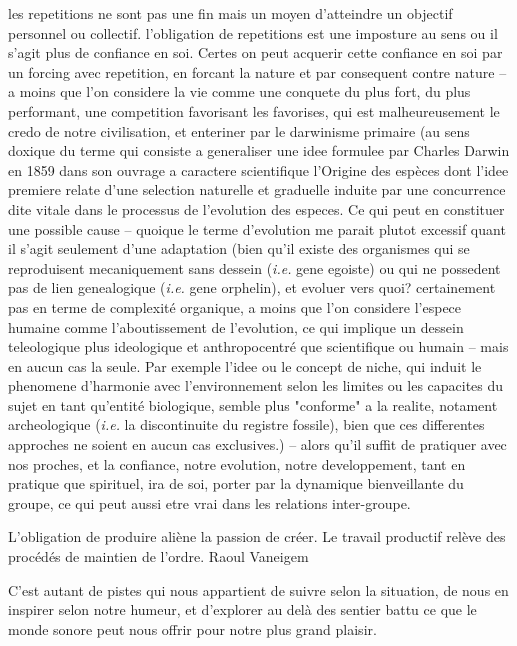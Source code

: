 \documentclass{article}
\begin{document}
les repetitions ne sont pas une fin mais un moyen d'atteindre un objectif personnel ou collectif.
l'obligation de repetitions est une imposture au sens ou il s'agit plus de confiance en soi. Certes on peut acquerir cette confiance en soi par un forcing avec repetition, en forcant la nature et par consequent contre nature -- a moins que l'on considere la vie comme une conquete du plus fort, du plus performant, une competition favorisant les favorises, qui est malheureusement le credo de notre civilisation, et enteriner par le darwinisme primaire (au sens doxique du terme qui consiste a generaliser une idee formulee par Charles Darwin en 1859 dans son ouvrage a caractere scientifique l'Origine des espèces dont l'idee premiere relate d'une selection naturelle et graduelle induite par une concurrence dite vitale dans le processus de l'evolution des especes. Ce qui peut en constituer une possible cause -- quoique le terme d'evolution me parait plutot excessif quant il s'agit seulement d'une adaptation (bien qu'il existe des organismes qui se reproduisent mecaniquement sans dessein (\textit{i.e.} gene egoiste) ou qui ne possedent pas de lien genealogique (\textit{i.e.} gene orphelin), et evoluer vers quoi? certainement pas en terme de complexité organique, a moins que l'on considere l'espece humaine comme l'aboutissement de l'evolution, ce qui implique un dessein teleologique plus ideologique et anthropocentré que scientifique ou humain -- mais en aucun cas la seule. Par exemple l'idee ou le concept de niche, qui induit le phenomene d'harmonie avec l'environnement selon les limites ou les capacites du sujet en tant qu'entité biologique, semble plus "conforme" a la realite, notament archeologique (\textit{i.e.} la discontinuite du registre fossile), bien que ces differentes approches ne soient en aucun cas exclusives.) -- alors qu'il suffit de pratiquer avec nos proches, et la confiance, notre evolution, notre developpement, tant en pratique que spirituel, ira de soi, porter par la dynamique bienveillante du groupe, ce qui peut aussi etre vrai dans les relations inter-groupe.

L’obligation de produire aliène la passion de créer. Le travail productif relève des procédés de maintien de l’ordre.
Raoul Vaneigem

C’est autant de pistes qui nous appartient de suivre selon la situation, de nous en inspirer selon notre humeur, et d’explorer au delà des sentier battu ce que le monde sonore peut nous offrir pour notre plus grand plaisir. 

\bigskip
\end{document}
